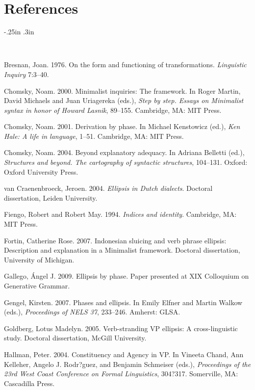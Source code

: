 \documentclass[output=paper]{LSP/langsci}
\begin{document}
\section*{References}

\newenvironment{reflist} {\begin{list} {} {\listparindent -.25in
\leftmargin .3in} \item \ \vspace{-.3in} } {\end{list} }

\begin{reflist}

Bresnan, Joan. 1976. On the form and functioning of transformations. \emph{Linguistic Inquiry} 7:3--40.

Chomsky, Noam. 2000. Minimalist inquiries: The framework. In Roger Martin, David Michaels and Juan Uriagereka (eds.), \emph{Step by step. Essays on Minimalist syntax in honor of Howard Lasnik}, 89--155. Cambridge, MA: MIT Press.

Chomsky, Noam. 2001. Derivation by phase. In Michael Kenstowicz (ed.), \emph{Ken Hale: A life in language}, 1--51. Cambridge, MA: MIT Press.

Chomsky, Noam. 2004. Beyond explanatory adequacy. In Adriana Belletti (ed.), \emph{Structures and beyond. The cartography of syntactic structures}, 104--131. Oxford: Oxford University Press.

van Craenenbroeck, Jeroen. 2004. \emph{Ellipsis in Dutch dialects}. Doctoral dissertation, Leiden University.

Fiengo, Robert and Robert May. 1994. \emph{Indices and identity}. Cambridge, MA: MIT Press.

Fortin, Catherine Rose. 2007. Indonesian sluicing and verb phrase ellipsis: Description and explanation in a Minimalist framework. Doctoral dissertation, University of Michigan. 

Gallego, \'{A}ngel J. 2009. Ellipsis by phase. Paper presented at XIX Colloquium on Generative Grammar. 

Gengel, Kirsten. 2007. Phases and ellipsis. In Emily Elfner and Martin Walkow (eds.), \emph{Proceedings of NELS 37}, 233--246. Amherst: GLSA. 

Goldberg, Lotus Madelyn. 2005. Verb-stranding VP ellipsis: A cross-linguistic study. Doctoral dissertation, McGill University. 

Hallman, Peter. 2004. Constituency and Agency in VP. In Vineeta Chand, Ann Kelleher, Angelo J. Rodr?guez, and Benjamin Schmeiser (eds.), \emph{Proceedings of the 23rd West Coast Conference on Formal Linguistics}, 304?317. Somerville, MA: Cascadilla Press.


\end{reflist}
\end{document}
